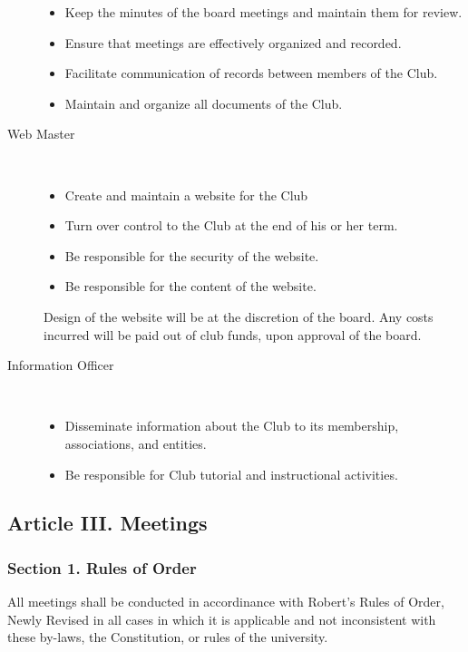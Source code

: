 \documentclass{article}
\begin{document}
\begin{description}
          \vspace{-12pt}
          \begin{itemize}
            \item Keep the minutes of the board meetings and maintain them for review.
            \item Ensure that meetings are effectively organized and recorded.
            \item Facilitate communication of records between members of the Club.
            \item Maintain and organize all documents of the Club.
          \end{itemize}
        \item[Web Master] ~\\
          \vspace{-12pt}
          \begin{itemize}
            \item Create and maintain a website for the Club
            \item Turn over control to the Club at the end of his or her term.
            \item Be responsible for the security of the website.
            \item Be responsible for the content of the website.
          \end{itemize}

          Design of the website will be at the discretion of the board. Any costs incurred will be paid out of club funds, upon approval of the board.

        \item[Information Officer] ~\\
          \vspace{-12pt}
          \begin{itemize}
            \item Disseminate information about the Club to its membership, associations, and entities.
            \item Be responsible for Club tutorial and instructional activities.
          \end{itemize}
        \end{description}

  \subsection{Article III. Meetings}

    \subsubsection{Section 1. Rules of Order}
      All meetings shall be conducted in accordinance with Robert's Rules of Order, Newly Revised in all cases in which it is applicable and not inconsistent with these by-laws, the Constitution, or rules of the university.
\end{document}
